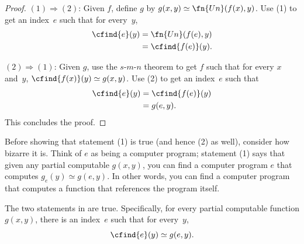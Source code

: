 \documentclass[../../../include/open-logic-section]{subfiles}
\begin{document}
\begin{proof}
$(1) \Rightarrow (2)$: Given $f$, define $g$ by $g(x,y) \simeq
\fn{Un}(f(x),y)$. Use (1) to get an index~$e$ such that for every~$y$,
\begin{align*}
\cfind{e}(y) & = \fn{Un}(f(e),y) \\
& = \cfind{f(e)}(y).
\end{align*}

$(2) \Rightarrow (1)$: Given $g$, use the $s$-$m$-$n$ theorem to get $f$ such
that for every $x$ and~$y$, $\cfind{f(x)}(y) \simeq g(x,y)$. Use (2) to
get an index~$e$ such that
\begin{align*}
\cfind{e}(y) & = \cfind{f(e)}(y) \\
& = g(e,y).
\end{align*}
This concludes the proof.
\end{proof}

\begin{explain}
Before showing that statement (1) is true (and hence (2) as well),
consider how bizarre it is. Think of $e$ as being a computer program;
statement (1) says that given any partial computable $g(x,y)$, you can
find a computer program $e$ that computes $g_e(y) \simeq g(e,y)$. In
other words, you can find a computer program that computes a function
that references the program itself.
\end{explain}

\begin{thm}
The two statements in  are
true. Specifically, for every partial computable function $g(x,y)$,
there is an index~$e$ such that for every~$y$,
\[
\cfind{e}(y) \simeq g(e,y).
\]
\end{thm}
\end{document}

